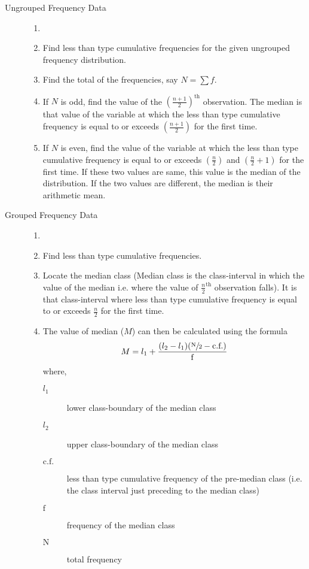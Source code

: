 \documentclass[
10pt, %
a4paper, %
]{report}
\begin{document}
\begin{description}
\item[Ungrouped Frequency Data]
\begin{enumerate}[Step 1.]
\item[]
\item Find less than type cumulative frequencies for the given ungrouped frequency distribution.
\item Find the total of the frequencies, say \(N = \sum f\).
\item If \(N\) is odd, find the value of the \(\left( \frac{n+1}{2} \right)^\text{th}\) observation. The median is that value of the variable at which the less than type cumulative frequency is equal to or exceeds \(\left( \frac{n+1}{2} \right)\) for the first time.
\item If \(N\) is even, find the value of the variable at which the less than type cumulative frequency is equal to or exceeds \(\left( \frac{n}{2} \right)\) and \(\left( \frac{n}{2} + 1 \right)\) for the first time. If these two values are same, this value is the median of the distribution. If the two values are different, the median is their arithmetic mean.
\end{enumerate}
\item[Grouped Frequency Data]
\begin{enumerate}[Step 1.]
\item[]
\item Find less than type cumulative frequencies.
\item Locate the median class (Median class is the class-interval in which the value of the median i.e. where the value of \(\frac{n}{2}^\text{th}\) observation falls). It is that class-interval where less than type cumulative frequency is equal to or
exceeds \(\frac{n}{2}\) for the first time.
\item The value of median (\(M\)) can then be calculated using the formula
\[
M = l_1 + \dfrac{(l_2 - l_1)(\sfrac{\mathrm{N}}{2} - \text{c.f.})}{\mathrm{f}}
\]
where,
\begin{description}
\item[\(l_1\)] lower class-boundary of the median class
\item[\(l_2\)] upper class-boundary of the median class
\item[\(\mathrm{c.f.}\)] less than type cumulative frequency of the pre-median class (i.e. the class interval just preceding to the median class)
\item[\(\mathrm{f}\)] frequency of the median class
\item[\(\mathrm{N}\)] total frequency
\end{description}
\end{enumerate}
\end{description}
\end{document}
